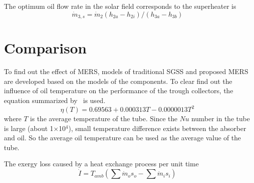 The optimum oil flow rate in the solar field corresponds to the superheater is
\begin{equation}
  \dot{m}_{3,s} = \dot{m}_{2}(h_{2a} - h_{2i})/(h_{3a} - h_{3b})
\end{equation}

\section{Comparison}

To find out the effect of MERS, models of traditional SGSS and proposed MERS are developed based on the models of the components. To clear find out the influence of oil temperature on the performance of the trough collectors, the equation summarized by~\cite{Rovira2011} is used.
\begin{equation}
  \eta(T) =  0.69563 + 0.000313T - 0.0000013T^2
\end{equation}
where $T$ is the average temperature of the tube. Since the $Nu$ number in the tube is large (about 1$\times$10$^4$), small temperature difference exists between the absorber and oil. So the average oil temperature can be used as the average value of the tube.

The exergy loss caused by a heat exchange process per unit time
\begin{equation}
  \dot{I} = T_{amb} (\sum \dot{m}_os_o - \sum \dot{m}_is_i)
\end{equation}


